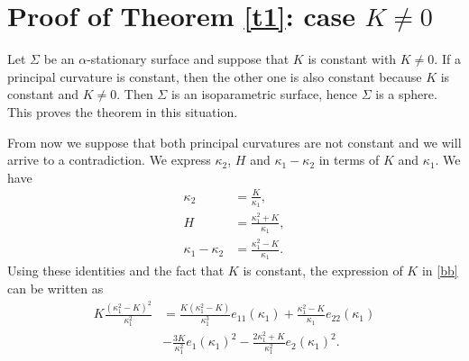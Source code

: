 \documentclass[a4paper,12pt]{amsart}
\theoremstyle{definition}
\begin{document}
\section{Proof of Theorem \ref{t1}: case $K\not=0$}\label{s3}

Let $\Sigma$ be an $\alpha$-stationary surface and suppose that $K$ is constant with $K\not=0$. 
If a principal curvature is constant, then the other one is also constant because $K$ is constant and $K\not=0$. Then $\Sigma$ is an isoparametric surface, hence  $\Sigma$ is a   sphere.  This proves the theorem in this situation. 

From now we suppose that both principal curvatures are not constant and we will arrive to a contradiction. We express $\kappa_2$, $H$ and $\kappa_1-\kappa_2$ in terms of $K$ and $\kappa_1$. We have 
\begin{equation}\label{gm2}
\begin{split}
\kappa_2&=\frac{K}{\kappa_1},\\
H&=\frac{\kappa_1^2+K}{\kappa_1},\\
\kappa_1-\kappa_2&=\frac{\kappa_1^2-K}{\kappa_1}.
\end{split}
\end{equation}
Using these identities and the fact that $K$ is constant, the expression of $K$ in \eqref{bb} can be written as 
 \begin{equation}\label{bb2}
  \begin{split}
   K\frac{(\kappa_1^2-K)^2}{\kappa_1^2}&=\frac{K(\kappa_1^2-K)}{\kappa_1^3}e_{11}(\kappa_1) +\frac{\kappa_1^2-K}{\kappa_1}e_{22}(\kappa_1)\\
   &-\frac{3K}{\kappa_1^2}e_1(\kappa_1)^2-\frac{2\kappa_1^2+K}{\kappa_1^2}e_2(\kappa_1)^2.
   \end{split}
\end{equation}
\end{document}

